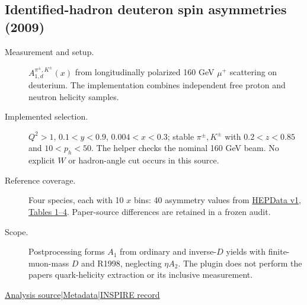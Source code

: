 \documentclass[11pt,a4paper]{article}
\newcommand{\id}[1]{{\small\texttt{\detokenize{#1}}}}
\begin{document}
\subsection{\texorpdfstring{Identified-hadron deuteron spin asymmetries (2009)}{Identified-hadron deuteron spin asymmetries (2009)}}
\id{COMPASS_2009_I820721}\quad\cite{r820721}
\begin{description}
\item[Measurement and setup.] $A_{1,d}^{\pi^\pm,K^\pm}(x)$ from longitudinally polarized 160 GeV $\mu^+$ scattering on deuterium. The implementation combines independent free proton and neutron helicity samples.
\item[Implemented selection.] $Q^2>1$, $0.1<y<0.9$, $0.004<x<0.3$; stable $\pi^\pm,K^\pm$ with $0.2<z<0.85$ and $10<p_h<50$. The helper checks the nominal 160 GeV beam. No explicit $W$ or hadron-angle cut occurs in this source.
\item[Reference coverage.] Four species, each with 10 $x$ bins: 40 asymmetry values from \href{https://www.hepdata.net/record/ins820721?version=1}{HEPData v1, Tables 1--4}. Paper-source differences are retained in a frozen audit.
\item[Scope.] Postprocessing forms $A_1$ from ordinary and inverse-$D$ yields with finite-muon-mass $D$ and R1998, neglecting $\eta A_2$. The plugin does not perform the paper\textquotesingle s quark-helicity extraction or its inclusive measurement.
\end{description}
{\small\href{https://github.com/apapaefs/HerwigPolarizedPheno/blob/105045bd757aaa6b217e87811dc5f9a22a8d1cef/analyses/rivet/dis/COMPASS_2009_I820721.cc}{Analysis source}\quad|\quad\href{https://github.com/apapaefs/HerwigPolarizedPheno/blob/105045bd757aaa6b217e87811dc5f9a22a8d1cef/analyses/rivet/dis/COMPASS_2009_I820721.info}{Metadata}\quad|\quad\href{https://inspirehep.net/literature/820721}{INSPIRE record}}
\end{document}

